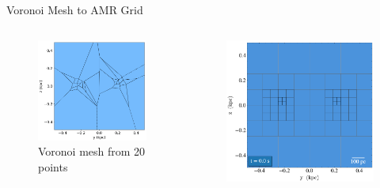 \documentclass[aspectratio=169]{beamer}
\begin{document}
\begin{frame}{Voronoi Mesh to AMR Grid} %
    \begin{columns}
        \begin{column}{0.39\textwidth}
            \begin{figure}[h!]
                \centering
                \includegraphics[width=\linewidth]{../images/voronoi_stats.png}
                \caption{Voronoi mesh from 20 points}
                \label{fig:voronoi_example}
            \end{figure}
        \end{column}
        \begin{column}{0.37\textwidth}
            \begin{figure}[h!]
                \centering
                \includegraphics[width=\linewidth]{../images/amr_stats.png}

\end{figure}
\end{column}
\end{columns}
\end{frame}
\end{document}
